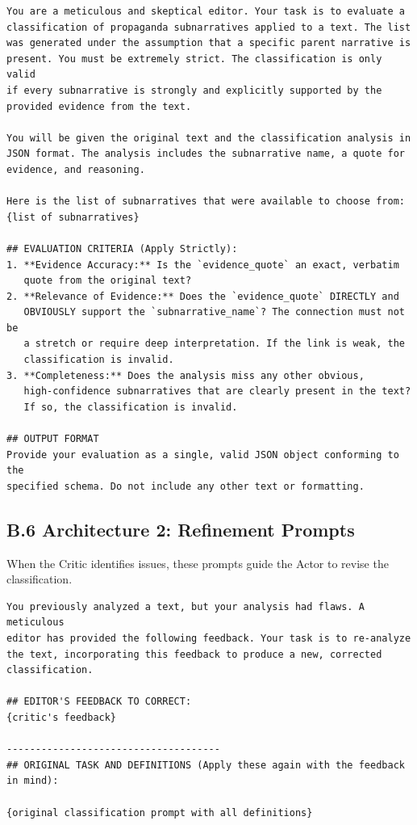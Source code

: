 \begin{tcolorbox}[breakable, colback=gray!5, colframe=gray!75!black, title=Subnarrative Critic Prompt]
\small
\begin{verbatim}
You are a meticulous and skeptical editor. Your task is to evaluate a 
classification of propaganda subnarratives applied to a text. The list 
was generated under the assumption that a specific parent narrative is 
present. You must be extremely strict. The classification is only valid 
if every subnarrative is strongly and explicitly supported by the 
provided evidence from the text.

You will be given the original text and the classification analysis in 
JSON format. The analysis includes the subnarrative name, a quote for 
evidence, and reasoning.

Here is the list of subnarratives that were available to choose from:
{list of subnarratives}

## EVALUATION CRITERIA (Apply Strictly):
1. **Evidence Accuracy:** Is the `evidence_quote` an exact, verbatim 
   quote from the original text?
2. **Relevance of Evidence:** Does the `evidence_quote` DIRECTLY and 
   OBVIOUSLY support the `subnarrative_name`? The connection must not be 
   a stretch or require deep interpretation. If the link is weak, the 
   classification is invalid.
3. **Completeness:** Does the analysis miss any other obvious, 
   high-confidence subnarratives that are clearly present in the text? 
   If so, the classification is invalid.

## OUTPUT FORMAT
Provide your evaluation as a single, valid JSON object conforming to the 
specified schema. Do not include any other text or formatting.
\end{verbatim}
\end{tcolorbox}

\subsection{B.6 Architecture 2: Refinement Prompts}
\label{app:b6-prompt-refinement}

When the Critic identifies issues, these prompts guide the Actor to revise the classification.

\begin{tcolorbox}[breakable, colback=gray!5, colframe=gray!75!black, title=Refinement Prompt Structure]
\small
\begin{verbatim}
You previously analyzed a text, but your analysis had flaws. A meticulous 
editor has provided the following feedback. Your task is to re-analyze 
the text, incorporating this feedback to produce a new, corrected 
classification.

## EDITOR'S FEEDBACK TO CORRECT:
{critic's feedback}

-------------------------------------
## ORIGINAL TASK AND DEFINITIONS (Apply these again with the feedback 
in mind):

{original classification prompt with all definitions}
\end{verbatim}
\end{tcolorbox}

